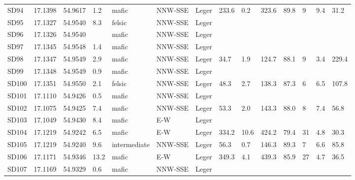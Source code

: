\begin{tabular}{llllllllllllll}
SD94 & 17.1398 & 54.9617 & 1.2 & mafic & NNW-SSE & Leger & 233.6 & 0.2 & 323.6 & 89.8 & 9 & 9.4 & 31.2 \\
SD95 & 17.1327 & 54.9540 & 8.3 & felsic & NNW-SSE & Leger &  &  &  &  &  &  &  \\
SD96 & 17.1326 & 54.9540 &  & mafic & NNW-SSE & Leger &  &  &  &  &  &  &  \\
SD97 & 17.1345 & 54.9548 & 1.4 & mafic & NNW-SSE & Leger &  &  &  &  &  &  &  \\
SD98 & 17.1347 & 54.9549 & 2.9 & mafic & NNW-SSE & Leger & 34.7 & 1.9 & 124.7 & 88.1 & 9 & 3.4 & 229.4 \\
SD99 & 17.1348 & 54.9549 & 0.9 & mafic & NNW-SSE & Leger &  &  &  &  &  &  &  \\
SD100 & 17.1351 & 54.9550 & 2.1 & felsic & NNW-SSE & Leger & 48.3 & 2.7 & 138.3 & 87.3 & 6 & 6.5 & 107.8 \\
SD101 & 17.1110 & 54.9426 & 0.5 & mafic & NNW-SSE & Leger &  &  &  &  &  &  &  \\
SD102 & 17.1075 & 54.9425 & 7.4 & mafic & NNW-SSE & Leger & 53.3 & 2.0 & 143.3 & 88.0 & 8 & 7.4 & 56.8 \\
SD103 & 17.1049 & 54.9430 & 8.4 & mafic & E-W & Leger &  &  &  &  &  &  &  \\
SD104 & 17.1219 & 54.9242 & 6.5 & mafic & E-W & Leger & 334.2 & 10.6 & 424.2 & 79.4 & 31 & 4.8 & 30.3 \\
SD105 & 17.1219 & 54.9240 & 9.6 & intermediate & NNW-SSE & Leger & 56.3 & 0.7 & 146.3 & 89.3 & 7 & 6.6 & 85.8 \\
SD106 & 17.1171 & 54.9346 & 13.2 & mafic & E-W & Leger & 349.3 & 4.1 & 439.3 & 85.9 & 27 & 4.7 & 36.5 \\
SD107 & 17.1169 & 54.9329 & 0.6 & mafic & NNW-SSE & Leger &  &  &  &  &  &  &  \\
\bottomrule
\end{tabular}

\normalsize